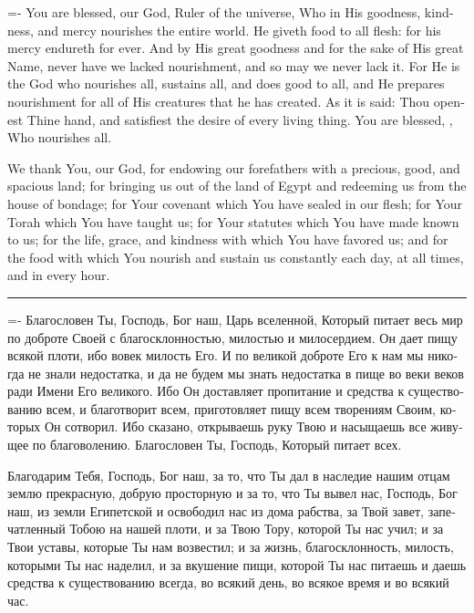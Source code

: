 \documentclass[11pt,twoside]{article}
\makeatletter
\def\fakesc{\@ifnextchar[{\fakesc@opt}{\fakesc@opt[6.5][5.5]}} %
\def\fakesc@opt[#1][#2]{%
  \bgroup
  \def\cap@size{#1}%
  \def\low@size{#2}%
  \obeyspaces
  \helpersc
}
\def\helpersc#1{\helperscii #1\relax\relax\egroup}
\def\helperscii#1{%
  \ifx\relax#1%
  \else
    \ifcat#1\@sptoken
      {}%
      \expandafter\expandafter\expandafter\helperscii
    \else
      \ifnum`#1=\uccode`#1
        {\fontsize{\cap@size}{\cap@size}\selectfont#1}%
      \else
        {\fontsize{\low@size}{\low@size}\selectfont\uppercase{#1}}%
      \fi
      \expandafter\expandafter\expandafter\helperscii
      \expandafter
    \fi
  \fi
}
\newcommand{\ykvk}[2]{\fakesc[#1][#2]{Lord}\xspace}
\makeatother
\begin{document}
{\fontsize{6.5}{7.7}%
\begin{english}
\selectfont%
\lineskiplimit=-\maxdimen%
You are blessed, \ykvk{6.5}{5.5}{} our God, Ruler of the universe, Who in His
goodness, kindness, and mercy nourishes the entire world. He
%
giveth food to all flesh: for his mercy endureth for ever.
%
And by His great goodness and for the sake of His great Name,
never have we lacked nourishment, and so may we never
lack it. For He is the God who nourishes all, sustains all,
and does good to all, and He prepares nourishment for all of His
creatures that he has created. As it is said:
%
Thou openest Thine hand, and satisfiest the desire of every living thing.
%
You are blessed, \ykvk{6.5}{5.5}{}, Who nourishes all.

We thank You, \ykvk{6.5}{5.5}{} our God, for endowing our forefathers with a precious,
good, and spacious land; for bringing us out of the land of Egypt and
redeeming us from the house of bondage; for Your covenant which You
have sealed in our flesh; for Your Torah which You have taught us; for
Your statutes which You have made known to us; for the life, grace, and
kindness with which You have favored us; and for the food with
which You nourish and sustain us constantly\textemdash{}%
each day, at all times, and in every hour.\par
\end{english}
\vspace{\parskip}%
\vfill%
\hrule
\vfill%
\begin{russian}
\selectfont%
\lineskiplimit=-\maxdimen%
Благословен Ты, Господь, Бог наш, Царь вселенной, Который питает весь
мир по доброте Своей с благосклонностью, милостью и милосердием. Он
{\russianverse дает пищу всякой плоти, ибо вовек милость Его}. И по великой доброте
Его к нам мы никогда не знали недостатка, и да не будем мы знать
недостатка в пище во веки веков ради Имени Его великого. Ибо Он
доставляет пропитание и средства к существованию всем, и благотворит
всем, приготовляет пищу всем творениям Своим, которых Он сотворил.
Ибо сказано,
{\russianverse открываешь руку Твою и насыщаешь все живущее по благоволению.}
Благословен Ты, Господь, Который питает всех.

Благодарим Тебя, Господь, Бог наш, за то, что Ты дал в наследие нашим
отцам землю прекрасную, добрую просторную и за то, что Ты вывел нас,
Господь, Бог наш, из земли Египетской и освободил нас из дома рабства,
за Твой завет, запечатленный Тобою на нашей плоти, и за Твою Тору,
которой Ты нас учил; и за Твои уставы, которые Ты нам возвестил; и за
жизнь, благосклонность, милость, которыми Ты нас наделил, и за
вкушение пищи, которой Ты нас питаешь и даешь средства к существованию
всегда, во всякий день, во всякое время и во всякий час.\par
\end{russian}
}
\newpage
\end{document}
